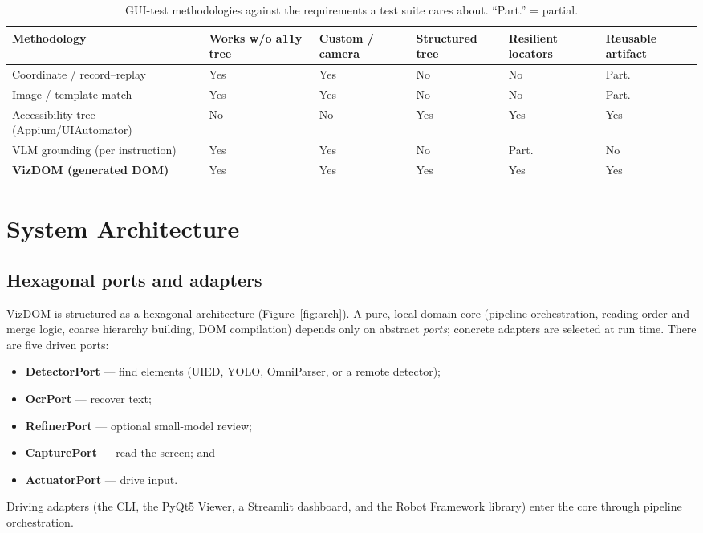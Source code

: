 \documentclass[11pt,a4paper]{article}
\begin{document}
\begin{table}[H]
  \centering\footnotesize
  \caption{GUI-test methodologies against the requirements a test suite cares about.
  ``Part.'' = partial.}
  \label{tab:methods}
  \begin{tabular}{@{}p{3.0cm}p{1.7cm}p{1.6cm}p{1.6cm}p{1.6cm}p{1.5cm}@{}}
    \toprule
    Methodology & Works w/o a11y tree & Custom / camera & Structured tree & Resilient locators & Reusable artifact \\
    \midrule
    Coordinate / record--replay & Yes & Yes & No & No & Part. \\
    Image / template match & Yes & Yes & No & No & Part. \\
    Accessibility tree (Appium/UIAutomator) & No & No & Yes & Yes & Yes \\
    VLM grounding (per instruction) & Yes & Yes & No & Part. & No \\
    \textbf{VizDOM (generated DOM)} & Yes & Yes & Yes & Yes & Yes \\
    \bottomrule
  \end{tabular}
\end{table}

\section{System Architecture}
\label{sec:arch}

\subsection{Hexagonal ports and adapters}
VizDOM is structured as a hexagonal architecture (Figure~\ref{fig:arch}). A pure,
local domain core (pipeline orchestration, reading-order and merge logic, coarse
hierarchy building, DOM compilation) depends only on abstract \emph{ports};
concrete adapters are selected at run time. There are five driven ports:
\begin{itemize}[leftmargin=1.4em]
  \item \textbf{DetectorPort} --- find elements (UIED, YOLO, OmniParser, or a
        remote detector);
  \item \textbf{OcrPort} --- recover text;
  \item \textbf{RefinerPort} --- optional small-model review;
  \item \textbf{CapturePort} --- read the screen; and
  \item \textbf{ActuatorPort} --- drive input.
\end{itemize}
Driving adapters (the CLI, the PyQt5 Viewer, a Streamlit dashboard, and the Robot
Framework library) enter the core through pipeline orchestration.
\end{document}
